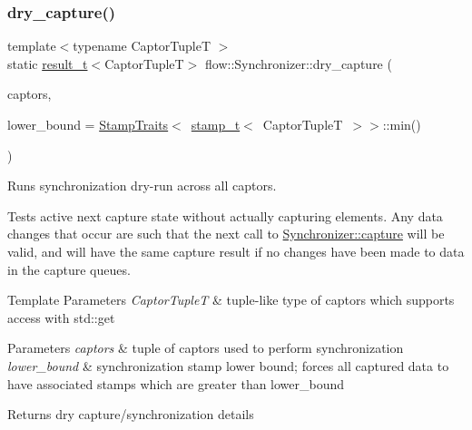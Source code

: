 \subsubsection{\texorpdfstring{dry\+\_\+capture()}{dry\_capture()}}
{\footnotesize\ttfamily template$<$typename Captor\+TupleT $>$ \\
static \hyperlink{classflow_1_1_synchronizer_a4f9693650274ae93f5b9a11cb41a2d80}{result\+\_\+t}$<$Captor\+TupleT$>$ flow\+::\+Synchronizer\+::dry\+\_\+capture (\begin{DoxyParamCaption}\item[{Captor\+TupleT \&\&}]{captors,  }\item[{const \hyperlink{classflow_1_1_synchronizer_a0f1e7062475c9492191e29b26d09106c}{stamp\+\_\+arg\+\_\+t}$<$ Captor\+TupleT $>$}]{lower\+\_\+bound = {\ttfamily \hyperlink{structflow_1_1_stamp_traits}{Stamp\+Traits}$<$~\hyperlink{classflow_1_1_synchronizer_a2a443abb40ad2413e6d5f7a7f3cfe4a7}{stamp\+\_\+t}$<$~CaptorTupleT~$>$$>$\+:\+:min()} }\end{DoxyParamCaption})\hspace{0.3cm}{\ttfamily [static]}}



Runs synchronization dry-\/run across all captors. 

Tests active next capture state without actually capturing elements. Any data changes that occur are such that the next call to {\ttfamily \hyperlink{classflow_1_1_synchronizer_af8bda24c2e5ea24037d8fcaceda96885}{Synchronizer\+::capture}} will be valid, and will have the same capture result if no changes have been made to data in the capture queues.


\begin{DoxyTemplParams}{Template Parameters}
{\em Captor\+TupleT} & tuple-\/like type of captors which supports access with {\ttfamily std\+::get}\\
\hline
\end{DoxyTemplParams}

\begin{DoxyParams}{Parameters}
{\em captors} & tuple of captors used to perform synchronization \\
\hline
{\em lower\+\_\+bound} & synchronization stamp lower bound; forces all captured data to have associated stamps which are greater than {\ttfamily lower\+\_\+bound}\\
\hline
\end{DoxyParams}
\begin{DoxyReturn}{Returns}
dry capture/synchronization details 
\end{DoxyReturn}
\mbox{\label{classflow_1_1_synchronizer_a268ae5410af9df6887bd99cb954a214d}} 
